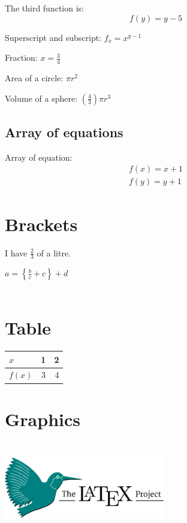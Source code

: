 \documentclass[12pt]{article}
\begin{document}
The third function is:
\begin{equation}
 f(y) = y-5
\end{equation}

Superscript and subscript: $f_x = x^{y-1}$

Fraction: $x = \frac{3}{4}$

Area of a circle: $\pi r^2$

Volume of a sphere: $(\frac{4}{3})\pi r^3$

\subsection{Array of equations}
Array of equation:
\begin{eqnarray}
f(x) = x+1\\
f(y) = y+1
\end{eqnarray}

\section{Brackets}
I have $\displaystyle\frac{2}{3}$ of a litre.

$a = \left\{\frac{b}{c}+c\right\}+d$
\\ \\
\section{Table}
\begin{table}[h]
	\centering
	\begin{tabular}{|l|c|r|}
	\hline
	$x$ & 1 & 2\\\hline
	$f(x)$ & 3 & 4\\\hline
\end{tabular}
\end{table}
\section{Graphics}
\begin{center}
\includegraphics[height=4cm, width=7cm]{images.png}
\end{center}
\end{document}
